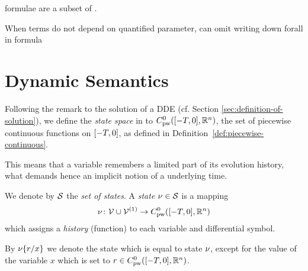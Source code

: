     \FOLR formulae are a subset of \ddL.

    When terms do not depend on quantified parameter, can omit writing down forall in formula

\section{Dynamic Semantics}
    \label{sec:dynamic-semantics}

    Following the remark to the solution of a DDE (cf. Section \ref{sec:definition-of-solution}), we define the \emph{state space} in \ddL to $\statespace$, the set of piecewise continuous functions on $\delayinterval$, as defined in Definition~\ref{def:piecewise-continuous}.

    This means that a variable remembers a limited part of its evolution history, what demands hence an implicit notion of a underlying time.

    We denote by $\states$ the \emph{set of states}. A \emph{state} $\asstate\in\states$ is a mapping
    \begin{equation}
        \asstate \from \allvars\cup\diffvars \to \statespace
    \end{equation}
    which assigns a \emph{history} (function) to each variable and differential symbol.

    By $\modif{\asstate}{x}{r}$ we denote the state which is equal to state $\asstate$, except for the value of the variable $x$ which is set to $r\in\statespace$.



